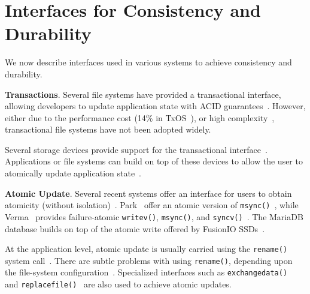 \section{Interfaces for Consistency and Durability}
\label{sec-related-interfaces}

We now describe interfaces used in various systems to achieve
consistency and durability.

\vspace{0.1in} \noindent \textbf{Transactions}. Several file systems
have provided a transactional interface, allowing developers to update
application state with ACID guarantees~\cite{Olson07-NTFS,
  PorterEtAl08-TxOS, spillane2009enabling, seltzer1990transaction}.
However, either due to the performance cost (14\% in
TxOS~\cite{PorterEtAl08-TxOS}), or high
complexity~\cite{Olson07-NTFS}, transactional file systems have not
been adopted widely.

Several storage devices provide support for the transactional
interface~\cite{Prabhakaran+08-txflash, choi2009jftl, park2005atomic,
  galtoledo05-flash, lu2013lighttx, kang2013x,
  ouyang+11-beyondblockio, coburn2013aries, lu15-blurred}.
Applications or file systems can build on top of these devices to
allow the user to atomically update application
state~\cite{min2015lightweight}.

\vspace{0.1in} \noindent \textbf{Atomic Update}. Several recent
systems offer an interface for users to obtain atomicity (without
isolation)~\cite{fusionIOmariaDB, verma2015failure, park2013failure}.
Park \etal\ offer an atomic version of
\texttt{msync()}~\cite{park2013failure}, while Verma \etal\ provides
failure-atomic \texttt{writev()}, \texttt{msync()}, and
\texttt{syncv()}~\cite{verma2015failure}. The MariaDB database builds
on top of the atomic write offered by FusionIO
SSDs~\cite{fusionIOmariaDB}.

At the application level, atomic update is usually carried using the
\texttt{rename()} system call~\cite{URLPosix-Rename}. There are subtle
problems with using \texttt{rename()}, depending upon the file-system
configuration~\cite{Thanu+14-Alice, URLmassivefsthread}. Specialized
interfaces such as \texttt{exchangedata()}~\cite{Apple-exchangedata}
and \texttt{replacefile()}~\cite{Windows-ReplaceFile} are also used
to achieve atomic updates.
 
